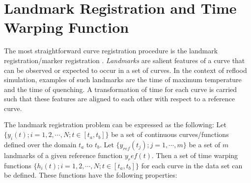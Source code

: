 \section{Landmark Registration and Time Warping Function}\label{app:landmark}

The most straightforward curve registration procedure is the landmark registration/marker registration \cite{Ramsay2009}.
\emph{Landmarks} are salient features of a curve that can be observed or expected to occur in a set of curves.
In the context of reflood simulation, examples of such landmarks are the time of maximum temperature and the time of quenching.
A transformation of time for each curve is carried such that these features are aligned to each other with respect to a reference curve.

The landmark registration problem can be expressed as the following: 
Let $\{y_i(t); i = 1, 2, \cdots, N; t \in [t_a,t_b]\}$ be a set of continuous curves/functions defined over the domain $t_a$ to $t_b$.
Let $\{y_{ref}(t_j); j = 1, \cdots, m\}$ be a set of $m$ landmarks of a given reference function $y_ref(t)$.
Then a set of time warping functions $\{h_i(t); i = 1, 2, \cdots, N; t \in [t_a, t_b]\}$ for each curve in the data set can be defined.
These functions have the following properties:

